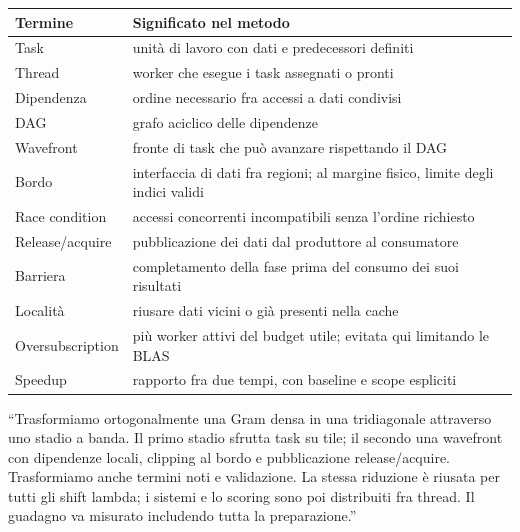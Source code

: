 \documentclass[11pt,a4paper]{article}
\begin{document}
\begin{center}\small\begin{tabularx}{\linewidth}{lX}\toprule
Termine&Significato nel metodo\\\midrule
Task&unità di lavoro con dati e predecessori definiti\\
Thread&worker che esegue i task assegnati o pronti\\
Dipendenza&ordine necessario fra accessi a dati condivisi\\
DAG&grafo aciclico delle dipendenze\\
Wavefront&fronte di task che può avanzare rispettando il DAG\\
Bordo&interfaccia di dati fra regioni; al margine fisico, limite degli indici validi\\
Race condition&accessi concorrenti incompatibili senza l'ordine richiesto\\
Release/acquire&pubblicazione dei dati dal produttore al consumatore\\
Barriera&completamento della fase prima del consumo dei suoi risultati\\
Località&riusare dati vicini o già presenti nella cache\\
Oversubscription&più worker attivi del budget utile; evitata qui limitando le BLAS\\
Speedup&rapporto fra due tempi, con baseline e scope espliciti\\\bottomrule
\end{tabularx}\end{center}
\begin{idea}[title=Una risposta breve da esame]
``Trasformiamo ortogonalmente una Gram densa in una tridiagonale attraverso
uno stadio a banda. Il primo stadio sfrutta task su tile; il secondo una
wavefront con dipendenze locali, clipping al bordo e pubblicazione
release/acquire. Trasformiamo anche termini noti e validazione. La stessa
riduzione è riusata per tutti gli shift lambda; i sistemi e lo scoring sono
poi distribuiti fra thread. Il guadagno va misurato includendo tutta la preparazione.''
\end{idea}
\clearpage
\end{document}
